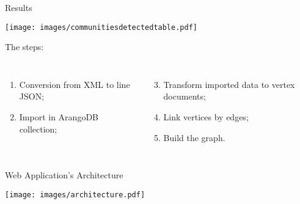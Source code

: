 \documentclass[aspectratio = 169, 15pt]{beamer}
\begin{document}
    \begin{frame}{Results}
        \begin{center}
            \vspace*{-0.1cm}
            \texttt{[image: images/communitiesdetectedtable.pdf]}
        \end{center}
        
        \vspace*{-0.3cm}
        {\color{darkgray}The steps:}
        \begin{columns}[t]
                \vspace*{-0.3cm}
                \begin{enumerate}
                	\item \small Conversion from XML to line JSON;
                	\item \small Import in ArangoDB collection;
                \end{enumerate}
                
                \vspace*{-1.3cm}
                \begin{enumerate}
                    \setcounter{enumi}{2}
                	\item \small Transform imported data to vertex documents;
                	\item \small Link vertices by edges;
                	\item \small Build the graph.
                \end{enumerate}
        \end{columns}
    \end{frame}
    
    \begin{frame}{Web Application's Architecture}
        \begin{center}
            \vspace*{-0.1cm}
            \texttt{[image: images/architecture.pdf]}
        \end{center}
    \end{frame}
    
\end{document}
